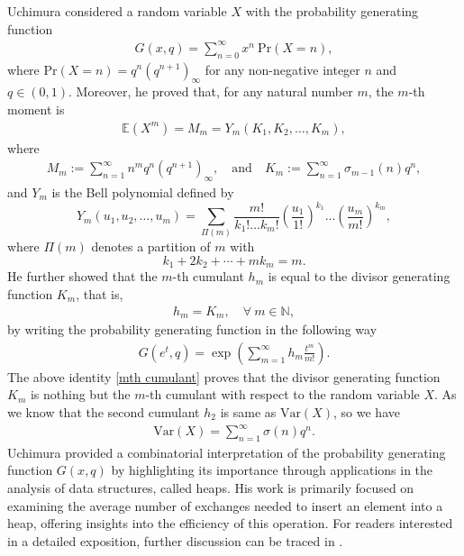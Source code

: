 \documentclass[11pt,reqno]{amsart}
\renewcommand{\(}{\left\(}
\renewcommand{\)}{\right\)}
\renewcommand{\[}{\left\[}
\renewcommand{\]}{\right\]}
\numberwithin{equation}{section}
\theoremstyle{plain}
\begin{document}
Uchimura \cite[p.~76]{uchimura87} considered a random variable $X$ with the probability generating function 
\begin{align*}
G(x,q)=\sum_{n=0}^\infty x^n~ \mathrm{Pr}(X=n),
\end{align*}
where $ \mathrm{Pr}(X=n)=q^n(q^{n+1})_\infty$ for any non-negative integer $n$ and $q \in (0,1)$. 
Moreover, he proved that,   for any natural number $m$, the $m$-th moment is
\begin{align}\label{Uchimura's gen}
\mathbb{E}(X^m)= M_m=Y_m(K_1,K_2,\dots,K_m),  
\end{align}
where
\begin{align}\label{define M_m and K_m}
M_m := \sum_{n=1}^{\infty} n^m q^n (q^{n+1})_{\infty}, \quad \text{and} \quad K_{m} := \sum_{n=1}^{\infty} \sigma_{m-1}(n) q^n, 
\end{align} 
and $Y_m$ is the Bell polynomial defined by
\begin{equation}\label{define Bell polynomial}
Y_m \left( u_1, u_2, \dots, u_m\right) = \sum_{\Pi(m)} \frac{m!}{k_1 ! \dots k_m !} \left( \frac{u_1}{1!} \right)^{k_1} \dots \left( \frac{u_m}{m!} \right)^{k_m},
\end{equation}
where $\Pi(m)$ denotes a partition of $m$ with
\begin{equation*}
k_1 + 2 k_2 + \cdots + mk_m = m.  
\end{equation*}
He further showed that the $m$-th cumulant $h_m$ is equal to the divisor generating function $K_m$,  that is,  
\begin{align}\label{mth cumulant}
h_m=K_m,  \quad \forall~m \in \mathbb{N},  
\end{align}
 by writing the probability generating function in the following way
\begin{align*}
G(e^t,q)=\exp\left( \sum_{m=1}^\infty h_m \frac{t^m}{m!} \right).  
\end{align*}
The above identity \eqref{mth cumulant} proves that the divisor generating function $K_m$ is nothing but the $m$-th cumulant with respect to the random variable $X$.  As we know that the second cumulant $h_2$ is same as $\mathrm{Var}(X)$,  so we have
\begin{align}\label{variance by uchimura}
\mathrm{Var}(X)=\sum_{n=1}^{\infty} \sigma(n) q^n.
\end{align}
Uchimura \cite{uchimura87} provided a combinatorial interpretation of the probability generating function $G(x,q)$ by highlighting its importance through applications in the analysis of data structures, called heaps. 
His work is primarily focused on examining the average number of exchanges needed to insert an element into a heap, offering insights into the efficiency of this operation. For readers interested in a detailed exposition, further discussion can be traced in \cite[Section~3]{uchimura87}.
\end{document}
